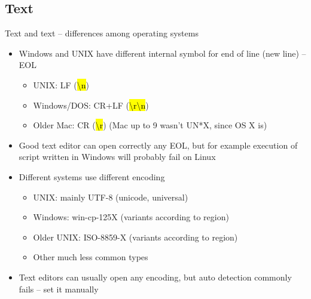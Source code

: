 \documentclass[compress, ucs, xelatex, 11pt, xcolor=svgnames,
  hyperref={
    bookmarks=true,
    unicode=true,
    colorlinks=true,
    pdftitle={Linux, command line and MetaCentrum},
    plainpages=false,
    pdfauthor={Vojtech Zeisek},
    pdfsubject={Course about use of Linux command line, writing shell scripts and using MetaCentrum of CESNET},
    pdfcreator={XeLaTeX},
    pdfkeywords={Linux, GNU, BASH, shell, command line, MetaCentrum},
    linkcolor=Red,
    anchorcolor=Blue,
    citecolor=Purple,
    filecolor=DodgerBlue,
    menucolor=DarkOrchid,
    urlcolor=DeepSkyBlue,
    pdftex},
  url={hyphens, lowtilde} %
  ]{beamer}
\renewcommand{\texttt}[1]{\hl{\ttfamily #1}}
\begin{document}
\subsection{Text}

\begin{frame}{Text and text -- differences among operating systems}
\begin{itemize}
  \item Windows and UNIX have different internal symbol for end of line (new line) -- EOL
  \begin{itemize}
    \item UNIX: LF (\texttt{\textbackslash n})
    \item Windows/DOS: CR+LF (\texttt{\textbackslash r\textbackslash n})
    \item Older Mac: CR (\texttt{\textbackslash r}) (Mac up to 9 wasn't UN*X, since OS X is)
  \end{itemize}
  \item Good text editor can open correctly any EOL, but for example execution of script written in Windows will probably fail on Linux
  \item Different systems use different encoding
  \begin{itemize}
    \item UNIX: mainly UTF-8 (unicode, universal)
    \item Windows: win-cp-125X (variants according to region)
    \item Older UNIX: ISO-8859-X (variants according to region)
    \item Other much less common types
  \end{itemize}
  \item Text editors can usually open any encoding, but auto detection commonly fails -- set it manually
\end{itemize}
\end{frame}
\end{document}
